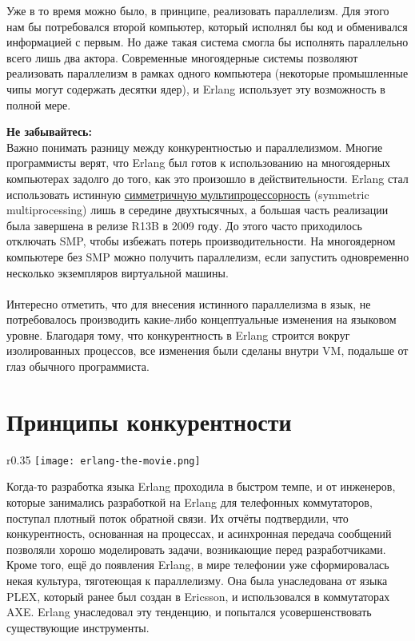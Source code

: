 Уже в то время можно было, в принципе, реализовать параллелизм.
Для этого нам бы потребовался второй компьютер, который исполнял бы код и обменивался информацией с первым.
Но даже такая система смогла бы исполнять параллельно всего лишь два актора.
Современные многоядерные системы позволяют реализовать параллелизм в рамках одного компьютера (некоторые промышленные чипы могут содержать десятки ядер), и Erlang использует эту возможность в полной мере.\\
\colorbox{lorange}
{
\begin{minipage}{1.0\linewidth}
    \textbf{Не забывайтесь:}\\
    Важно понимать разницу между конкурентностью и параллелизмом.
    Многие программисты верят, что Erlang был готов к использованию на многоядерных компьютерах задолго до того, как это произошло в действительности.
    Erlang стал использовать истинную \href{http://en.wikipedia.org/wiki/Symmetric\_multiprocessing}{симметричную мультипроцессорность} (symmetric multiprocessing) лишь в середине двухтысячных, а большая часть реализации была завершена в релизе R13B в 2009 году.
    До этого часто приходилось отключать SMP, чтобы избежать потерь производительности.
    На многоядерном компьютере без SMP можно получить параллелизм, если запустить одновременно несколько экземпляров виртуальной машины.\\
    \\
    Интересно отметить, что для внесения истинного параллелизма в язык, не потребовалось производить какие\--либо концептуальные изменения на языковом уровне.
    Благодаря тому, что конкурентность в Erlang строится вокруг изолированных процессов, все изменения были сделаны внутри VM, подальше от глаз обычного программиста.
\end{minipage}
}
\section{Принципы конкурентности}
\label{concepts-of-concurrency}
\begin{wrapfigure}{r}{0.35\linewidth}
    \texttt{[image: erlang-the-movie.png]}
\end{wrapfigure}
Когда\--то разработка языка Erlang проходила в быстром темпе, и от инженеров, которые занимались разработкой на Erlang для телефонных коммутаторов, поступал плотный поток обратной связи.
Их отчёты подтвердили, что конкурентность, основанная на процессах, и асинхронная передача сообщений позволяли хорошо моделировать задачи, возникающие перед разработчиками.
Кроме того, ещё до появления Erlang, в мире телефонии уже сформировалась некая культура, тяготеющая к параллелизму.
Она была унаследована от языка PLEX, который ранее был создан в Ericsson, и использовался в коммутаторах AXE.
Erlang унаследовал эту тенденцию, и попытался усовершенствовать существующие инструменты.

